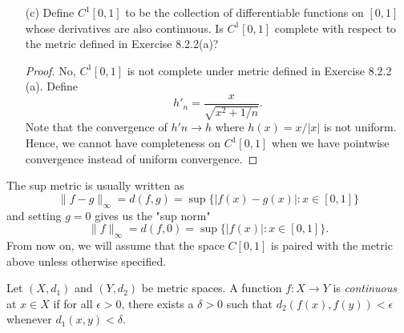 \begin{enumerate}
    \item[(c)] Define \( C^1[0,1] \) to be the collection of differentiable functions on \( [0,1]  \) whose derivatives are also continuous. Is \( C^{1}[0,1] \) complete with respect to the metric defined in Exercise 8.2.2(a)?
        \begin{proof}
            No, \( C^{1}[0,1] \) is not complete under metric defined in Exercise 8.2.2 (a). Define 
            \[h'_{n} = \frac{ x  }{ \sqrt{ x^{2} + 1/n  }  }. \]
            Note that the convergence of \( h'n \to h  \) where \( h(x) = x / | x |  \) is not uniform. Hence, we cannot have completeness on \( C^{1}[0,1]  \) when we have pointwise convergence instead of uniform convergence.
        \end{proof}
\end{enumerate}

The sup metric is usually written as 
\[  \lVert f -g  \rVert_{\infty }  = d(f,g) = \sup \{ | f(x) - g(x)  | : x \in [0,1] \}  \] and setting \( g = 0  \) gives us the "sup norm" 
\[  \lVert f \rVert_{\infty } = d(f,0 ) = \sup \{ | f(x)  | : x \in [0,1] \} . \]
From now on, we will assume that the space \( C[0,1]  \) is paired with the metric above unless otherwise specified.

\begin{definition}
Let \( (X, d_{1}) \) and \( (Y, d_{2}) \) be metric spaces. A function \( f: X \to Y  \) is \textit{continuous} at \( x \in  X  \) if for all \(\epsilon > 0  \), there exists a \( \delta > 0  \) such that \( d_{2}(f(x) , f(y)) < \epsilon  \) whenever \( d_{1} (x,y) < \delta \).  
\end{definition}

